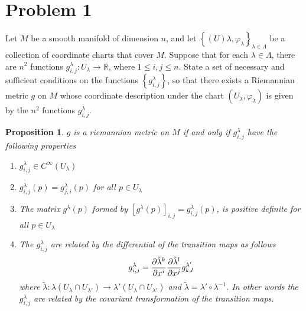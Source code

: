 \documentclass[a4paper]{article}
\newtheorem*{prop}{Proposition}
\begin{document}
\section*{Problem 1}%
Let $M$ be a smooth manifold of dimension $n$, and let $\left\{ (U){\lambda}, \varphi_{\lambda} \right\}_{\lambda \in \Lambda}$ be a collection of coordinate charts that cover $M$. Suppose that for each $\lambda \in \Lambda$, there are $n^2$ functions $g_{i,j}^\lambda: U_{\lambda} \rightarrow \mathds{R}$, where $1 \leq i,j \leq n.$ State a set of necessary and sufficient conditions on the functions $\left\{ g_{i,j}^\lambda \right\}$, so that there exists a Riemannian metric $g$ on $M$ whose coordinate description under the chart $(U_\lambda, \varphi_\lambda)$ is given by the $n^2$ functions $g_{i,j}^\lambda$.

\begin{prop}
  $g$ is a riemannian metric on $M$ if and only if $g_{i,j}^\lambda$ have the following properties
  \begin{enumerate}
    \item $g_{i,j}^\lambda \in C^{\infty}(U_\lambda)$
    \item $g_{i,j}^\lambda(p) = g_{j,i}^\lambda(p)$ for all $p  \in U_\lambda$
    \item The matrix $g^\lambda(p)$ formed by $[g^\lambda(p)]_{i,j} = g_{i,j}^\lambda(p)$, is positive definite for all $p \in U_\lambda$
    \item The $g_{i,j}^\lambda$ are related by the differential of the transition maps as follows
      \[
        g_{i,j}^{\lambda} = \pdv{\tilde{\lambda}^k}{x^i}\pdv{\tilde{\lambda}^l}{x^j} g_{k,l}^{\lambda'}
      \]
      where $\tilde{\lambda}: \lambda(U_\lambda \cap U_{\lambda'}) \rightarrow \lambda'(U_\lambda \cap U_{\lambda'})$ and $\tilde{\lambda} = \lambda' \circ \lambda^{-1}$. In other words the $g_{i,j}^\lambda$ are related by the covariant transformation of the transition maps.
  \end{enumerate}
\end{prop}
\end{document}

